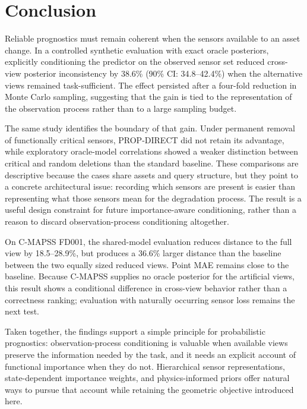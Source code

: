 \section{Conclusion}
\label{sec:conclusion}

Reliable prognostics must remain coherent when the sensors available to an asset change. In a controlled synthetic evaluation with exact oracle posteriors, explicitly conditioning the predictor on the observed sensor set reduced cross-view posterior inconsistency by 38.6\% (90\% CI: 34.8--42.4\%) when the alternative views remained task-sufficient. The effect persisted after a four-fold reduction in Monte Carlo sampling, suggesting that the gain is tied to the representation of the observation process rather than to a large sampling budget.

The same study identifies the boundary of that gain. Under permanent removal of functionally critical sensors, PROP-DIRECT did not retain its advantage, while exploratory oracle-model correlations showed a weaker distinction between critical and random deletions than the standard baseline. These comparisons are descriptive because the cases share assets and query structure, but they point to a concrete architectural issue: recording which sensors are present is easier than representing what those sensors mean for the degradation process. The result is a useful design constraint for future importance-aware conditioning, rather than a reason to discard observation-process conditioning altogether.

On C-MAPSS FD001, the shared-model evaluation reduces distance to the full view by 18.5--28.9\%, but produces a 36.6\% larger distance than the baseline between the two equally sized reduced views. Point MAE remains close to the baseline. Because C-MAPSS supplies no oracle posterior for the artificial views, this result shows a conditional difference in cross-view behavior rather than a correctness ranking; evaluation with naturally occurring sensor loss remains the next test.

Taken together, the findings support a simple principle for probabilistic prognostics: observation-process conditioning is valuable when available views preserve the information needed by the task, and it needs an explicit account of functional importance when they do not. Hierarchical sensor representations, state-dependent importance weights, and physics-informed priors offer natural ways to pursue that account while retaining the geometric objective introduced here.
